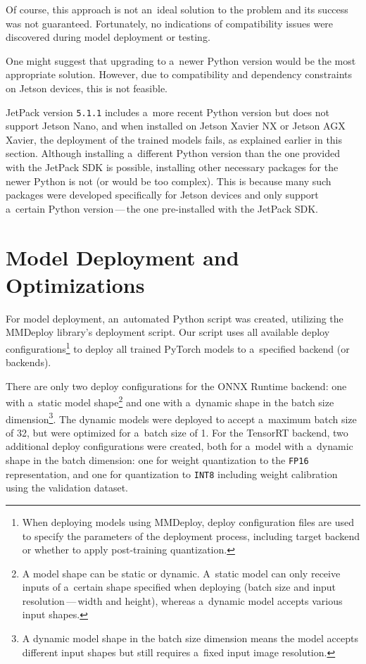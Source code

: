 Of course, this approach is not an~ideal solution to the problem and its success
was not guaranteed. Fortunately, no indications of compatibility issues were
discovered during model deployment or testing.

One might suggest that upgrading to a~newer Python version would be the most
appropriate solution. However, due to compatibility and dependency constraints
on Jetson devices, this is not feasible.

JetPack version \texttt{5.1.1} includes a~more recent Python version but does
not support Jetson Nano, and when installed on Jetson Xavier NX or Jetson AGX
Xavier, the deployment of the trained models fails, as explained earlier in this
section. Although installing a~different Python version than the one provided
with the JetPack SDK is possible, installing other necessary packages for the
newer Python is not (or would be too complex). This is because many such
packages were developed specifically for Jetson devices and only support
a~certain Python version\,---\,the one pre-installed with the JetPack SDK.


\section{Model Deployment and Optimizations}

For model deployment, an~automated Python script was created, utilizing the
MMDeploy library's deployment script. Our script uses all available deploy
configurations\footnote{When deploying models using MMDeploy, deploy
configuration files are used to specify the parameters of the deployment
process, including target backend or whether to apply post-training
quantization.} to deploy all trained PyTorch models to a~specified backend (or
backends).

There are only two deploy configurations for the ONNX Runtime backend: one
with a~static model shape\footnote{A model shape can be static or dynamic.
A~static model can only receive inputs of a~certain shape specified when deploying
(batch size and input resolution\,---\,width and height), whereas a~dynamic model
accepts various input shapes.} and one with a~dynamic shape in the batch size
dimension\footnote{A dynamic model shape in the batch size dimension means the
model accepts different input shapes but still requires a~fixed input image
resolution.}. The dynamic models were deployed to accept a~maximum batch size of
32, but were optimized for a~batch size of 1. For the TensorRT backend, two
additional deploy configurations were created, both for a~model with a~dynamic
shape in the batch dimension: one for weight quantization to the
\texttt{FP16} representation, and one for quantization to \texttt{INT8}
including weight calibration using the validation dataset.


